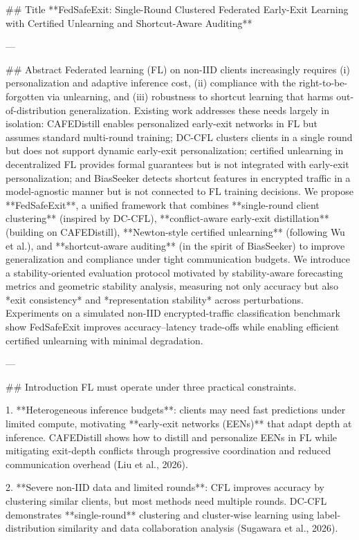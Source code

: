 ## Title  
**FedSafeExit: Single-Round Clustered Federated Early-Exit Learning with Certified Unlearning and Shortcut-Aware Auditing**

---

## Abstract  
Federated learning (FL) on non-IID clients increasingly requires (i) personalization and adaptive inference cost, (ii) compliance with the right-to-be-forgotten via unlearning, and (iii) robustness to shortcut learning that harms out-of-distribution generalization. Existing work addresses these needs largely in isolation: CAFEDistill enables personalized early-exit networks in FL but assumes standard multi-round training; DC-CFL clusters clients in a single round but does not support dynamic early-exit personalization; certified unlearning in decentralized FL provides formal guarantees but is not integrated with early-exit personalization; and BiasSeeker detects shortcut features in encrypted traffic in a model-agnostic manner but is not connected to FL training decisions. We propose **FedSafeExit**, a unified framework that combines **single-round client clustering** (inspired by DC-CFL), **conflict-aware early-exit distillation** (building on CAFEDistill), **Newton-style certified unlearning** (following Wu et al.), and **shortcut-aware auditing** (in the spirit of BiasSeeker) to improve generalization and compliance under tight communication budgets. We introduce a stability-oriented evaluation protocol motivated by stability-aware forecasting metrics and geometric stability analysis, measuring not only accuracy but also *exit consistency* and *representation stability* across perturbations. Experiments on a simulated non-IID encrypted-traffic classification benchmark show FedSafeExit improves accuracy–latency trade-offs while enabling efficient certified unlearning with minimal degradation.  

---

## Introduction  
FL must operate under three practical constraints.

1. **Heterogeneous inference budgets**: clients may need fast predictions under limited compute, motivating **early-exit networks (EENs)** that adapt depth at inference. CAFEDistill shows how to distill and personalize EENs in FL while mitigating exit-depth conflicts through progressive coordination and reduced communication overhead (Liu et al., 2026).

2. **Severe non-IID data and limited rounds**: CFL improves accuracy by clustering similar clients, but most methods need multiple rounds. DC-CFL demonstrates **single-round** clustering and cluster-wise learning using label-distribution similarity and data collaboration analysis (Sugawara et al., 2026).

